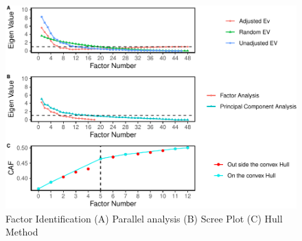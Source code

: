 \documentclass[
  english,
  man]{apa6}
\begin{document}
\begin{figure}

{\centering \includegraphics[width=1\linewidth,height=2.5\textheight]{manuscript_files/figure-latex/facIdFig-1} 

}

\caption{Factor Identification (A) Parallel analysis (B) Scree Plot (C) Hull Method}\label{fig:facIdFig}
\end{figure}
\end{document}
